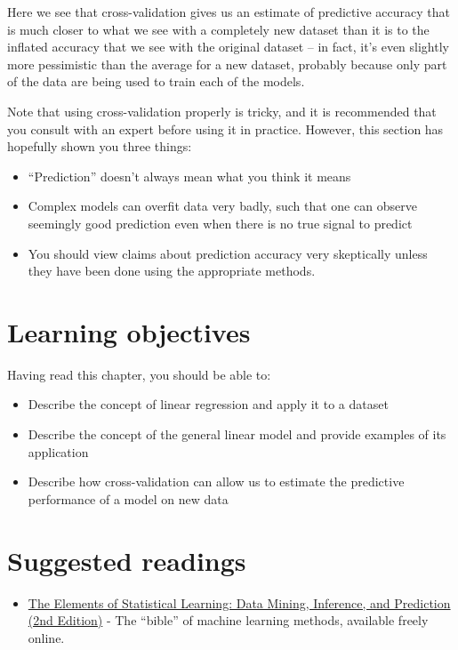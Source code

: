 \documentclass[12pt,]{book}
\providecommand{\tightlist}{%
  \setlength{\itemsep}{0pt}\setlength{\parskip}{0pt}}
\theoremstyle{definition}
\theoremstyle{definition}
\theoremstyle{definition}
\theoremstyle{remark}
\begin{document}
Here we see that cross-validation gives us an estimate of predictive accuracy that is much closer to what we see with a completely new dataset than it is to the inflated accuracy that we see with the original dataset -- in fact, it's even slightly more pessimistic than the average for a new dataset, probably because only part of the data are being used to train each of the models.

Note that using cross-validation properly is tricky, and it is recommended that you consult with an expert before using it in practice. However, this section has hopefully shown you three things:

\begin{itemize}
\tightlist
\item
  ``Prediction'' doesn't always mean what you think it means
\item
  Complex models can overfit data very badly, such that one can observe seemingly good prediction even when there is no true signal to predict
\item
  You should view claims about prediction accuracy very skeptically unless they have been done using the appropriate methods.
\end{itemize}

\hypertarget{learning-objectives-13}{%
\section{Learning objectives}\label{learning-objectives-13}}

Having read this chapter, you should be able to:

\begin{itemize}
\tightlist
\item
  Describe the concept of linear regression and apply it to a dataset
\item
  Describe the concept of the general linear model and provide examples of its application
\item
  Describe how cross-validation can allow us to estimate the predictive performance of a model on new data
\end{itemize}

\hypertarget{suggested-readings-10}{%
\section{Suggested readings}\label{suggested-readings-10}}

\begin{itemize}
\tightlist
\item
  \href{https://web.stanford.edu/~hastie/Papers/ESLII.pdf}{The Elements of Statistical Learning: Data Mining, Inference, and Prediction (2nd Edition)} - The ``bible'' of machine learning methods, available freely online.
\end{itemize}
\end{document}
